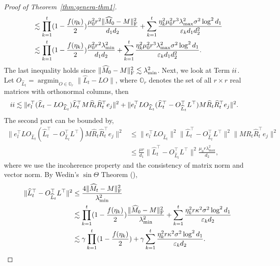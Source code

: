 \documentclass[12pt]{article}
\newcommand\fro[1]{\| #1 \|_{\rm{F}}}
\theoremstyle{plain}
\begin{document}
\begin{proof}[Proof of Theorem~\ref{thm:genera-thm1}]
\begin{align*}
        &\lesssim \prod_{k=1}^{t} (1-\frac{f(\eta_k)}{2}) \frac{\mu_0^2r^2\fro{\widehat{M}_0-M}^2}{d_1d_2} + \sum_{k=1}^{t}\frac{\eta_k^2\mu_0^2r^3\lambda_{\max}^2\sigma^2\log^2 d_1}{\varepsilon_k d_1d_2^2} \\
        &\lesssim \prod_{k=1}^{t} (1-\frac{f(\eta_k)}{2}) \frac{\mu_0^2r^2\lambda_{\min}^2}{d_1d_2} + \sum_{k=1}^{t}\frac{\eta_k^2\mu_0^2r^3\lambda_{\max}^2\sigma^2\log^2 d_1}{\varepsilon_k d_1d_2^2}.
    \end{align*}
    The last inequality holds since $\fro{\widehat{M}_0-M}^2\lesssim \lambda_{\min}^2$. Next, we look at Term $\uppercase\expandafter{\romannumeral2}$. Let $O_{\widehat{L}_t}=\mathop{\arg\min}_{O\in \mathbb{O}_r} \|\widehat{L}_t-LO\|$, where $\mathbb{O}_r$ denotes the set of all $r\times r$ real matrices with orthonormal columns, then
    \begin{align*} 
        \uppercase\expandafter{\romannumeral2}&\lesssim \|e_l^{\top}(\widehat{L}_t - LO_{\widehat{L}_t})\widehat{L}_t^{\top}M\widehat{R}_t\widehat{R}_t^{\top}e_j\|^2 + \|e_l^{\top}LO_{\widehat{L}_t}(\widehat{L}_t^{\top}-O_{\widehat{L}_t}^{\top}L^{\top})M\widehat{R}_t\widehat{R}_t^{\top}e_j\|^2.
    \end{align*}
    The second part can be bounded by,
    \begin{align*}
        \|e_l^{\top}LO_{\widehat{L}_t}(\widehat{L}_t^{\top}-O_{\widehat{L}_t}^{\top}L^{\top})M\widehat{R}_t\widehat{R}_t^{\top}e_j\|^2&\leq \|e_l^{\top}LO_{\widehat{L}_t}\|^2\|\widehat{L}_t^{\top}-O_{\widehat{L}_t}^{\top}L^{\top}\|^2\|M\widehat{R}_t\widehat{R}_t^{\top}e_j\|^2 \\
        &\leq \frac{\mu r}{d_1}\|\widehat{L}_t^{\top}-O_{\widehat{L}_t}^{\top}L^{\top}\|^2\frac{\mu_0r\lambda_{\max}^2}{d_2},
    \end{align*}
    where we use the incoherence property and the consistency of matrix norm and vector norm. By Wedin’s $\sin\Theta$ Theorem (\cite{davis1970rotation,wedin1972perturbation}), 
    \begin{align*}
        \|\widehat{L}_t^{\top}-O_{\widehat{L}_t}^{\top}L^{\top}\|^2&\leq \frac{4\fro{\widehat{M}_t-M}^2}{\lambda_{\min}^2} \\
        &\lesssim \prod_{k=1}^{t} (1-\frac{f(\eta_k)}{2})\frac{\fro{\widehat{M}_0-M}^2}{\lambda_{\min}^2} + \sum_{k=1}^{t}\frac{\eta_k^2r\kappa^2 \sigma^2\log^2 d_1}{\varepsilon_k d_2}\\
        &\lesssim \gamma\prod_{k=1}^{t} (1-\frac{f(\eta_k)}{2}) + \gamma\sum_{k=1}^{t}\frac{\eta_k^2r\kappa^2 \sigma^2\log^2 d_1}{\varepsilon_k d_2}.

\end{align*}
\end{proof}
\end{document}
